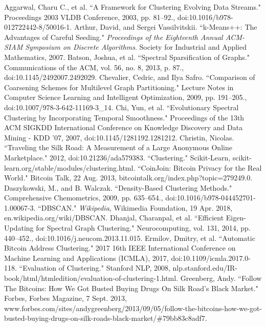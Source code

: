 \documentclass[journal]{IEEEtran}
\begin{document}
\clearpage
\begin{thebibliography}{1}
 Aggarwal, Charu C., et al. ``A Framework for Clustering Evolving Data Streams." Proceedings 2003 VLDB Conference, 2003, pp. 81–92., doi:10.1016/b978-012722442-8/50016-1.
 Arthur, David, and Sergei Vassilvitskii. ``k-Means++: The Advantages of Careful Seeding." \textit{Proceedings of the Eighteenth Annual ACM-SIAM Symposium on Discrete Algorithms}. Society for Industrial and Applied Mathematics, 2007. 
 Batson, Joshua, et al. ``Spectral Sparsification of Graphs." Communications of the ACM, vol. 56, no. 8, 2013, p. 87., doi:10.1145/2492007.2492029.
 Chevalier, Cedric, and Ilya Safro. ``Comparison of Coarsening Schemes for Multilevel Graph Partitioning." Lecture Notes in Computer Science Learning and Intelligent Optimization, 2009, pp. 191–205., doi:10.1007/978-3-642-11169-3\_14.
 Chi, Yun, et al. ``Evolutionary Spectral Clustering by Incorporating Temporal Smoothness." Proceedings of the 13th ACM SIGKDD International Conference on Knowledge Discovery and Data Mining - KDD '07, 2007, doi:10.1145/1281192.1281212.
 Christin, Nicolas. ``Traveling the Silk Road: A Measurement of a Large Anonymous Online Marketplace." 2012, doi:10.21236/ada579383.
 ``Clustering." Scikit-Learn, scikit-learn.org/stable/modules/clustering.html.
 ``CoinJoin: Bitcoin Privacy for the Real World." Bitcoin Talk, 22 Aug. 2013, bitcointalk.org/index.php?topic=279249.0.
 Daszykowski, M., and B. Walczak. ``Density-Based Clustering Methods." Comprehensive Chemometrics, 2009, pp. 635–654., doi:10.1016/b978-044452701-1.00067-3.
 ``DBSCAN." \textit{Wikipedia}, Wikimedia Foundation, 19 Apr. 2018, en.wikipedia.org/wiki/DBSCAN. 
 Dhanjal, Charanpal, et al. ``Efficient Eigen-Updating for Spectral Graph Clustering." Neurocomputing, vol. 131, 2014, pp. 440–452., doi:10.1016/j.neucom.2013.11.015.
 Ermilov, Dmitry, et al. ``Automatic Bitcoin Address Clustering." 2017 16th IEEE International Conference on Machine Learning and Applications (ICMLA), 2017, doi:10.1109/icmla.2017.0-118.
 ``Evaluation of Clustering." Stanford NLP, 2008, nlp.stanford.edu/IR-book/html/htmledition/evaluation-of-clustering-1.html.
 Greenberg, Andy. ``Follow The Bitcoins: How We Got Busted Buying Drugs On Silk Road's Black Market." Forbes, Forbes Magazine, 7 Sept. 2013, www.forbes.com/sites/andygreenberg/2013/09/05/follow-the-bitcoins-how-we-got-busted-buying-drugs-on-silk-roads-black-market/\#79bb83c8adf7.

\end{thebibliography}
\end{document}
